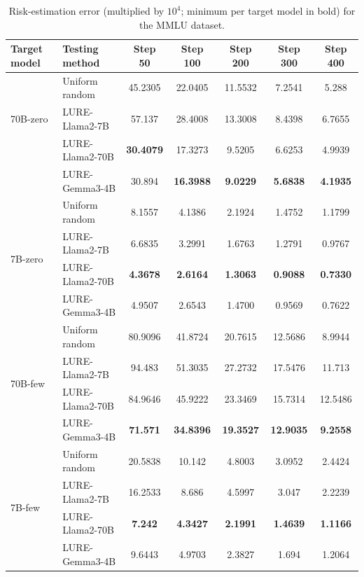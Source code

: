 \begin{table}[h]
    \centering
    \small
    \begin{tabular}{l l c c c c c}
        \toprule
        Target model & Testing method & Step 50 & Step 100 & Step 200 & Step 300 & Step 400 \\
        \midrule
        \multirow{3}{*}{70B-zero}& Uniform random & 45.2305 & 22.0405& 11.5532& 7.2541& 5.288 \\
        &LURE-Llama2-7B  & 57.137 & 28.4008& 13.3008& 8.4398&6.7655 \\
        &LURE-Llama2-70B &\textbf{30.4079}& {17.3273}& {9.5205}& {6.6253}& 4.9939 \\
        & LURE-Gemma3-4B & 30.894 & \textbf{16.3988}& \textbf{9.0229}& \textbf{5.6838}& \textbf{4.1935} \\
        \hline
        \multirow{4}{*}{7B-zero}& Uniform random& 8.1557& 4.1386& 2.1924& 1.4752& 1.1799 \\
        & LURE-Llama2-7B  & 6.6835& 3.2991& 1.6763& 1.2791&0.9767 \\
        & LURE-Llama2-70B &\textbf{4.3678}& \textbf{2.6164}& \textbf{1.3063}& \textbf{0.9088}&\textbf{0.7330} \\
        &LURE-Gemma3-4B & 4.9507& 2.6543& 1.4700& 0.9569 &0.7622 \\
        \hline
        \multirow{4}{*}{70B-few}& Uniform random & {80.9096}& {41.8724}& {20.7615}& {12.5686}& {8.9944} \\
        &LURE-Llama2-7B &94.483 & 51.3035& 27.2732 &17.5476& 11.713 \\
        & LURE-Llama2-70B & 84.9646& 45.9222& 23.3469& 15.7314& 12.5486 \\
        &LURE-Gemma3-4B & \textbf{71.571}& \textbf{34.8396}& \textbf{19.3527}& \textbf{12.9035}&\textbf{9.2558} \\
        \hline
        \multirow{4}{*}{7B-few}& Uniform random & 20.5838& 10.142 & 4.8003& 3.0952 & 2.4424 \\
        &LURE-Llama2-7B &16.2533& 8.686 & 4.5997 &3.047 & 2.2239 \\
        &LURE-Llama2-70B & \textbf{7.242} & \textbf{4.3427}& \textbf{2.1991}& \textbf{1.4639}& \textbf{1.1166} \\
        &LURE-Gemma3-4B & 9.6443& 4.9703& 2.3827 &1.694 & 1.2064\\
        \hline
    \end{tabular}
    \vspace{1em}
    \caption{
        Risk-estimation error (multiplied by $10^4$; minimum per target model in bold) for the MMLU dataset.
    }
    \label{tab:5}
\end{table}